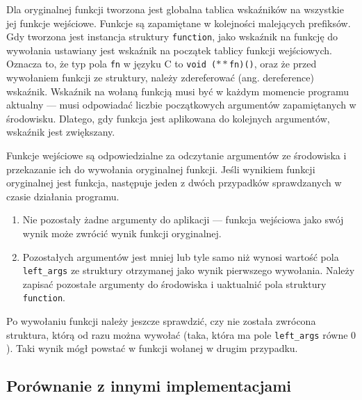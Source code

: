 \documentclass[declaration,shortabstract]{iithesis}
\begin{document}
Dla oryginalnej funkcji tworzona jest globalna tablica wskaźników na wszystkie 
jej funkcje wejściowe. Funkcje są zapamiętane w kolejności malejących prefiksów.
Gdy tworzona jest instancja struktury \texttt{function}, jako wskaźnik na 
funkcję do wywołania ustawiany jest wskaźnik na początek tablicy funkcji 
wejściowych. Oznacza to, że typ pola \texttt{fn} w języku C to 
\texttt{void ($\ast\ast$fn)()}, oraz że przed wywołaniem funkcji ze struktury,
należy zdereferować (ang. dereference) wskaźnik. Wskaźnik na wołaną funkcją 
musi być w każdym momencie programu aktualny --- musi odpowiadać liczbie 
początkowych argumentów zapamiętanych w środowisku. Dlatego, gdy 
funkcja jest aplikowana do kolejnych argumentów, wskaźnik jest zwiększany. 


Funkcje wejściowe są odpowiedzialne za odczytanie argumentów ze środowiska i 
przekazanie ich do wywołania oryginalnej funkcji. Jeśli wynikiem funkcji 
oryginalnej jest funkcja, następuje jeden z dwóch przypadków sprawdzanych w
czasie działania programu.

\begin{enumerate}
  \item Nie pozostały żadne argumenty do aplikacji ---
  funkcja wejściowa jako swój wynik może zwrócić wynik funkcji oryginalnej.
  \item Pozostałych argumentów jest mniej lub tyle samo niż wynosi 
  wartość pola \texttt{left\_args} ze struktury otrzymanej jako wynik 
  pierwszego wywołania.
  Należy zapisać pozostałe argumenty do środowiska i uaktualnić pola struktury 
  \texttt{function}.
\end{enumerate}

Po wywołaniu funkcji należy jeszcze sprawdzić, czy nie została zwrócona 
struktura, którą od razu można wywołać 
(taka, która ma pole \texttt{left\_args} 
równe $0$). Taki wynik mógł powstać w funkcji wołanej w drugim przypadku.

\subsection{Porównanie z innymi implementacjami}
\end{document}
